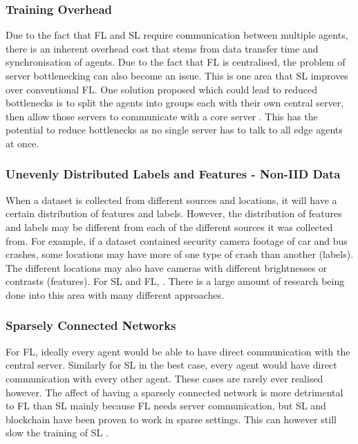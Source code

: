 \subsubsection{Training Overhead}
Due to the fact that FL and SL require communication between multiple agents, there is an inherent overhead cost that stems from data transfer time and synchronisation of agents. Due to the fact that FL is centralised, the problem of server bottlenecking can also become an issue. This is one area that SL improves over conventional FL. One solution proposed which could lead to reduced bottlenecks is to split the agents into groups each with their own central server, then allow those servers to communicate with a core server \cite{multi_center_fed_learning}. This has the potential to reduce bottlenecks as no single server has to talk to all edge agents at once.

\subsubsection{Unevenly Distributed Labels and Features - Non-IID Data}
When a dataset is collected from different sources and locations, it will have a certain distribution of features and labels. However, the distribution of features and labels may be different from each of the different sources it was collected from. For example, if a dataset contained security camera footage of car and bus crashes, some locations may have more of one type of crash than another (labels). The different locations may also have cameras with different brightnesses or contrasts (features). For SL and FL, . There is a large amount of research being done into this area with many different approaches.

\cite{multi_center_fed_learning}
\cite{model_agnostic_meta_learning}
\cite{fedbn}

\subsubsection{Sparsely Connected Networks}
For FL, ideally every agent would be able to have direct communication with the central server. Similarly for SL in the best case, every agent would have direct communication with every other agent. These cases are rarely ever realised however. The affect of having a sparsely connected network is more detrimental to FL than SL mainly because FL needs server communication, but SL and blockchain have been proven to work in sparse settings. This can however still slow the training of SL \citeme.


